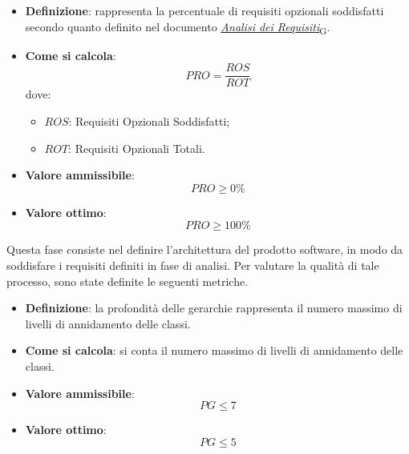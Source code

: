 \hypertarget{13M}{}
\begin{itemize}
	\item \textbf{Definizione}: rappresenta la percentuale di requisiti opzionali soddisfatti secondo quanto definito nel documento \href{https://7last.github.io/docs/rtb/documentazione-interna/glossario\#analisi-dei-requisiti}{\textit{Analisi dei Requisiti}\textsubscript{G}}.
	\item \textbf{Come si calcola}: \begin{equation*}PRO = \frac{ROS}{ROT}\end{equation*} dove:
		\begin{itemize}
			\item $ROS$: Requisiti Opzionali Soddisfatti;
			\item $ROT$: Requisiti Opzionali Totali.
		\end{itemize}
	\item \textbf{Valore ammissibile}: \begin{equation*}PRO \geq 0\%\end{equation*}
	\item \textbf{Valore ottimo}: \begin{equation*}PRO \geq 100\%\end{equation*}
\end{itemize}

Questa fase consiste nel definire l'architettura del prodotto software, in modo da soddisfare i requisiti definiti in fase di analisi. Per valutare la qualità di tale processo, sono state definite le seguenti metriche.
\hypertarget{14M}{}
\begin{itemize}
	\item \textbf{Definizione}: la profondità delle gerarchie rappresenta il numero massimo di livelli di annidamento delle classi.
	\item \textbf{Come si calcola}: si conta il numero massimo di livelli di annidamento delle classi.
	\item \textbf{Valore ammissibile}: \begin{equation*}PG \leq 7\end{equation*}
	\item \textbf{Valore ottimo}: \begin{equation*}PG \leq 5\end{equation*}
\end{itemize}

